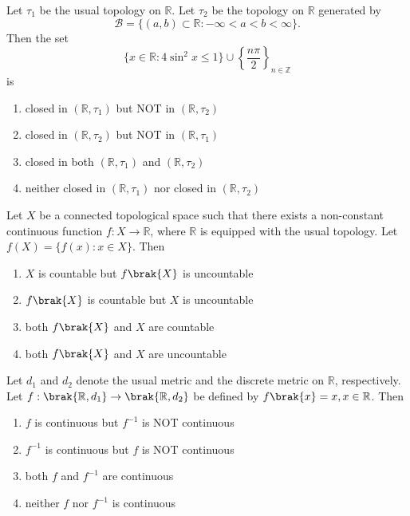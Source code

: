 \iffalse
\title{Assignment6}
\author{ee24btech11064}
\chapter{2015}
\section{ma}
\fi

\item Let $\tau_1$ be the usual topology on $\mathbb{R}$. Let $\tau_2$ be the topology on $\mathbb{R}$ generated by \[
\mathcal{B} = \{ (a, b) \subset \mathbb{R} : -\infty < a < b < \infty \}.
\]
Then the set 
\[
\{ x \in \mathbb{R} : 4 \sin^2 x \leq 1 \} \cup \left\{ \frac{n\pi}{2} \right\}_{n \in \mathbb{Z}}
\]
is
\begin{enumerate}
    \item closed in $(\mathbb{R}, \tau_1)$ but NOT in $(\mathbb{R}, \tau_2)$
    \item closed in $(\mathbb{R}, \tau_2)$ but NOT in $(\mathbb{R}, \tau_1)$
    \item closed in both $(\mathbb{R}, \tau_1)$ and $(\mathbb{R}, \tau_2)$
    \item neither closed in $(\mathbb{R}, \tau_1)$ nor closed in $(\mathbb{R}, \tau_2)$
\end{enumerate}
\vspace{0.5cm}
\item Let $X$ be a connected topological space such that there exists a non-constant continuous function 
$f : X \to \mathbb{R}$,
where $\mathbb{R}$ is equipped with the usual topology. Let 
$f(X) = \{ f(x) : x \in X \}$.
Then
\begin{enumerate}
      \item $X$ is countable but $f\brak{X}$ is uncountable
        \item $f\brak{X}$ is countable but $X$ is uncountable
        \item both $f\brak{X}$ and $X$ are countable
        \item both $f\brak{X}$ and $X$ are uncountable
\end{enumerate}
\vspace{0.5cm}
\item Let $d_1$ and $d_2$ denote the usual metric and the discrete metric on $\mathbb{R}$, respectively. Let $f: \brak{\mathbb{R},d_1}\rightarrow \brak{\mathbb{R},d_2}$ be defined by $f\brak{x}=x,x\in \mathbb{R}$. Then 
\begin{enumerate}
    \item $f$ is continuous but $f^{-1}$ is NOT continuous
    \item $f^{-1}$ is continuous but $f$ is NOT continuous
    \item both $f$ and $f^{-1}$ are continuous 
    \item neither $f$ nor $f^{-1}$ is continuous
\end{enumerate}
